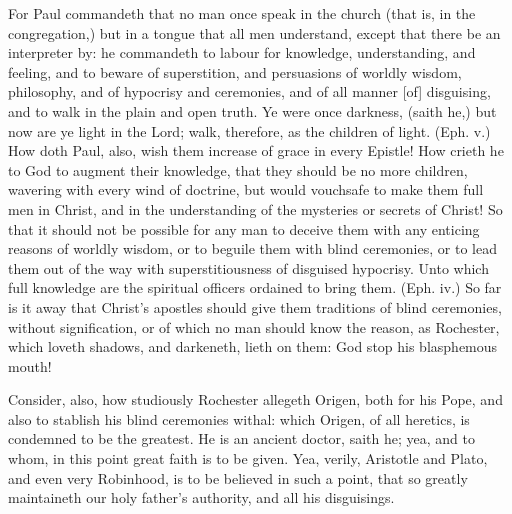 For Paul commandeth that no man once speak in the 
church (that is, in the congregation,) but in a tongue that all 
men understand, except that there be an interpreter by: 
he commandeth to labour for knowledge, understanding,
and feeling, and to beware of superstition, and 
persuasions of worldly wisdom, philosophy, and of hypocrisy
and ceremonies, and of all manner [of] disguising, and 
to walk in the plain and open truth. Ye were once darkness, 
(saith he,) but now are ye light in the Lord; walk, therefore,
as the children of light. (Eph. v.) How doth Paul, 
also, wish them increase of grace in every Epistle! How 
crieth he to God to augment their knowledge, that they 
should be no more children, wavering with every wind of 
doctrine, but would vouchsafe to make them full men in 
Christ, and in the understanding of the mysteries or 
secrets of Christ! So that it should not be possible for 
any man to deceive them with any enticing reasons of 
worldly wisdom, or to beguile them with blind ceremonies,
or to lead them out of the way with superstitiousness
of disguised hypocrisy. Unto which full knowledge 
are the spiritual officers ordained to bring them. (Eph. iv.) 
So far is it away that Christ's apostles should give them 
traditions of blind ceremonies, without signification, or of 
which no man should know the reason, as Rochester, 
which loveth shadows, and darkeneth, lieth on them: God 
stop his blasphemous mouth! 

Consider, also, how studiously Rochester allegeth 
Origen, both for his Pope, and also to stablish his blind 
ceremonies withal: which Origen, of all heretics, is condemned
to be the greatest. He is an ancient doctor, 
saith he; yea, and to whom, in this point great faith is to 
be given. Yea, verily, Aristotle and Plato, and even very 
Robinhood, is to be believed in such a point, that so 
greatly maintaineth our holy father's authority, and all his 
disguisings. 

